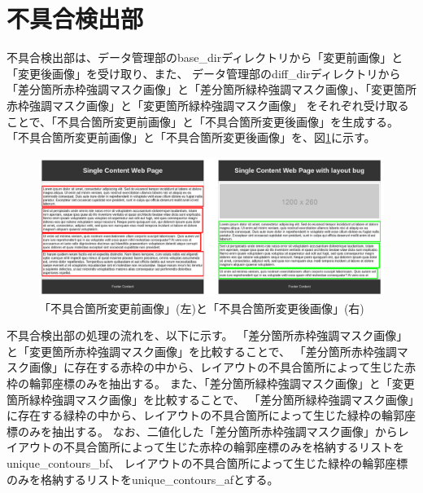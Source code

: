 \section{不具合検出部}\label{sec:Layout_bug_extraction_section}
不具合検出部は、データ管理部のbase\_dirディレクトリから「変更前画像」と「変更後画像」を受け取り、また、
データ管理部のdiff\_dirディレクトリから「差分箇所赤枠強調マスク画像」と「差分箇所緑枠強調マスク画像」、「変更箇所赤枠強調マスク画像」と「変更箇所緑枠強調マスク画像」
をそれぞれ受け取ることで、「不具合箇所変更前画像」と「不具合箇所変更後画像」を生成する。
「不具合箇所変更前画像」と「不具合箇所変更後画像」を、図\ref{fig: 4_subeffect}に示す。
\begin{figure}[tp]
    \begin{center}
        \includegraphics[width=1.0\columnwidth]{image/4_subEffect.png}
        \caption{「不具合箇所変更前画像」(左)と「不具合箇所変更後画像」(右)}
        \label{fig: 4_subeffect}
    \end{center}
\end{figure}
\par
\par
不具合検出部の処理の流れを、以下に示す。
「差分箇所赤枠強調マスク画像」と「変更箇所赤枠強調マスク画像」を比較することで、
「差分箇所赤枠強調マスク画像」に存在する赤枠の中から、レイアウトの不具合箇所によって生じた赤枠の輪郭座標のみを抽出する。
また、「差分箇所緑枠強調マスク画像」と「変更箇所緑枠強調マスク画像」を比較することで、
「差分箇所緑枠強調マスク画像」に存在する緑枠の中から、レイアウトの不具合箇所によって生じた緑枠の輪郭座標のみを抽出する。
なお、二値化した「差分箇所赤枠強調マスク画像」からレイアウトの不具合箇所によって生じた赤枠の輪郭座標のみを格納するリストをunique\_contours\_bf、
レイアウトの不具合箇所によって生じた緑枠の輪郭座標のみを格納するリストをunique\_contours\_afとする。
